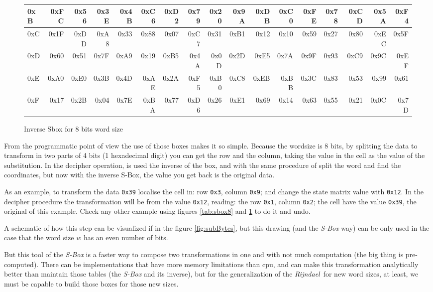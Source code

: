 \documentclass[10pt,a4paper,twoside]{llncs}
\newcommand{\rijndael}{\emph{Rijndael}}
\begin{document}
\begin{figure}[ht]
{\begin{center}
\begin{tabular}[]{|l||r|r|r|r|r|r|r|r|r|r|r|r|r|r|r|r|}
0xB &0xFC&0x56&0x3E&0x4B&0xC6&0xD2&0x79&0x20&0x9A&0xDB&0xC0&0xFE&0x78&0xCD&0x5A&0xF4\\\hline
0xC &0x1F&0xDD&0xA8&0x33&0x88&0x07&0xC7&0x31&0xB1&0x12&0x10&0x59&0x27&0x80&0xEC&0x5F\\\hline
0xD &0x60&0x51&0x7F&0xA9&0x19&0xB5&0x4A&0x0D&0x2D&0xE5&0x7A&0x9F&0x93&0xC9&0x9C&0xEF\\\hline
0xE &0xA0&0xE0&0x3B&0x4D&0xAE&0x2A&0xF5&0xB0&0xC8&0xEB&0xBB&0x3C&0x83&0x53&0x99&0x61\\\hline
0xF &0x17&0x2B&0x04&0x7E&0xBA&0x77&0xD6&0x26&0xE1&0x69&0x14&0x63&0x55&0x21&0x0C&0x7D\\\hline

\end{tabular}
\end{center}}
\caption{Inverse Sbox for 8 bits word size}
\label{tab:inv-sbox8}
\end{figure}

From the programmatic point of view the use of those boxes makes it so simple. Because the wordsize is 8 bits, by splitting the data to transform in two parts of 4 bits (1 hexadecimal digit) you can get the row and the column, taking the value in the cell as the value of the substitution. In the decipher operation, is used the inverse of the box, and with the same procedure of split the word and find the coordinates, but now with the inverse S-Box, the value you get back is the original data.

As an example, to transform the data \texttt{0x39} localise the cell in: row \texttt{0x3}, column \texttt{0x9}; and change the state matrix value with \texttt{0x12}. In the decipher procedure the transformation will be from the value \texttt{0x12}, reading: the row \texttt{0x1}, column \texttt{0x2}; the cell have the value \texttt{0x39}, the original of this example. Check any other example using figures \ref{tab:sbox8} and \ref{tab:inv-sbox8} to do it and undo.

A schematic of how this step can be visualized if in the figure \ref{fig:subBytes}, but this drawing (and the \emph{S-Box} way) can be only used in the case that the word size $w$ has an even number of bits.


But this tool of the \emph{S-Box} is a faster way to compose two transformations in one and with not much computation (the big thing is pre-computed). There can be implementations that have more memory limitations than cpu, and can make this transformation analytically better than maintain those tables (the \emph{S-Box} and its inverse), but for the generalization of the \rijndael\, for new word sizes, at least, we must be capable to build those boxes for those new sizes.
\end{document}
